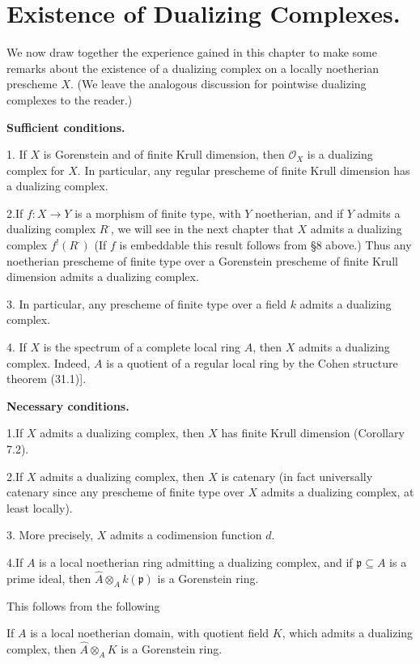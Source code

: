 \documentclass[12pt]{book}
\newcommand{\sheaf}[1]{\mathcal{#1}}
\begin{document}
\setcounter{299}
\section{Existence of Dualizing Complexes.}

We now draw together the experience gained in this chapter to make some remarks about the existence of a dualizing complex on a locally noetherian prescheme \(X\). (We leave the analogous discussion for pointwise dualizing complexes to the reader.)

\textbf{Sufficient conditions.}

1. If \(X\) is Gorenstein and of finite Krull dimension, then \(\sheaf{O}_{X}\) is a dualizing complex for \(X\). In particular, any regular prescheme of finite Krull dimension has a dualizing complex.

2.If \(f: X \to Y\) is a morphism of finite type, with \(Y\) noetherian, and if \(Y\) admits a dualizing complex \(R^{\cdot}\), we will see in the next chapter that \(X\) admits a dualizing complex \(f^{!}(R^{\cdot})\) (If \(f\) is embeddable this result follows from \S8 above.) Thus any noetherian prescheme of finite type over a Gorenstein prescheme of finite Krull dimension admits a dualizing complex.

3. In particular, any prescheme of finite type over a field \(k\) admits a dualizing complex.

4. If \(X\) is the spectrum of a complete local ring \(A\), then \(X\) admits a dualizing complex. Indeed, \(A\) is a quotient of a regular local ring by the Cohen structure theorem (31.1)].

\setcounter{page}{300}
\textbf{Necessary conditions.}

1.If \(X\) admits a dualizing complex, then \(X\) has finite Krull dimension (Corollary 7.2).

2.If \(X\) admits a dualizing complex, then \(X\) is catenary (in fact universally catenary since any prescheme of finite type over \(X\) admits a dualizing complex, at least locally).

3. More precisely, \(X\) admits a codimension function \(d\).

4.If \(A\) is a local noetherian ring admitting a dualizing complex, and if \(\mathfrak{p} \subseteq A\) is a prime ideal, then \(\hat{A} \otimes_{A} k(\mathfrak{p})\) is a Gorenstein ring.

This follows from the following

\begin{proposition}
If \(A\) is a local noetherian domain, with quotient field \(K\), which admits a dualizing complex, then \(\hat{A} \otimes_{A} K\) is a Gorenstein ring.
\end{proposition}
\end{document}
